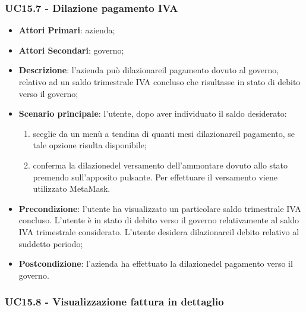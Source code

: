 \subsubsection{UC15.7 - Dilazione pagamento IVA}
\begin{itemize}
	\item \textbf{Attori Primari}: azienda;
	\item \textbf{Attori Secondari}: governo;
	\item \textbf{Descrizione}: l'azienda può dilazionare\glosp il pagamento dovuto al governo, relativo ad un saldo trimestrale IVA concluso che risultasse in stato di debito verso il governo;
	\item \textbf{Scenario principale}: l'utente, dopo aver individuato il saldo desiderato:
	\begin{enumerate}[label=\alph*.]
		\item sceglie da un menù a tendina di quanti mesi dilazionare\glosp il pagamento, se tale opzione risulta disponibile;
		\item conferma la dilazione\glosp del versamento dell'ammontare dovuto allo stato premendo sull'apposito pulsante. Per effettuare il versamento viene utilizzato MetaMask\glo.
	\end{enumerate}
	\item \textbf{Precondizione}: l'utente ha visualizzato un particolare saldo trimestrale IVA concluso. L'utente è in stato di debito verso il governo relativamente al saldo IVA trimestrale considerato. L'utente desidera dilazionare\glosp il debito relativo al suddetto periodo; 
	\item \textbf{Postcondizione}: l'azienda ha effettuato la dilazione\glosp del pagamento verso il governo.
\end{itemize} 

\subsubsection{UC15.8 - Visualizzazione fattura in dettaglio}

